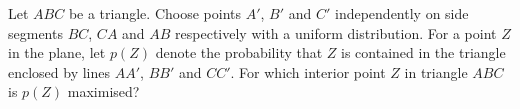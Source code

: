 Let $ABC$ be a triangle. Choose points $A'$, $B'$ and $C'$ independently on side segments $BC$, $CA$ and $AB$ respectively with a uniform distribution. For a point $Z$ in the plane, let $p(Z)$ denote the probability that $Z$ is contained in the triangle enclosed by lines $AA'$, $BB'$ and $CC'$. For which interior point $Z$ in triangle $ABC$ is $p(Z)$ maximised?
